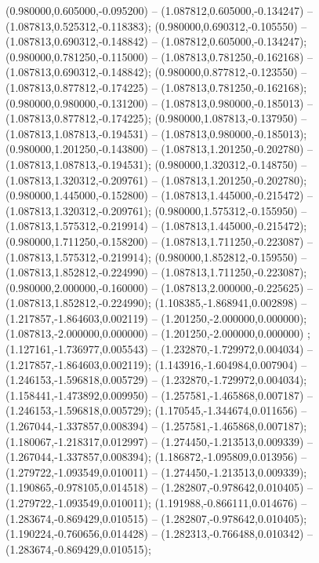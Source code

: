  (0.980000,0.605000,-0.095200) -- (1.087812,0.605000,-0.134247) -- (1.087813,0.525312,-0.118383);
 (0.980000,0.690312,-0.105550) -- (1.087813,0.690312,-0.148842) -- (1.087812,0.605000,-0.134247);
 (0.980000,0.781250,-0.115000) -- (1.087813,0.781250,-0.162168) -- (1.087813,0.690312,-0.148842);
 (0.980000,0.877812,-0.123550) -- (1.087813,0.877812,-0.174225) -- (1.087813,0.781250,-0.162168);
 (0.980000,0.980000,-0.131200) -- (1.087813,0.980000,-0.185013) -- (1.087813,0.877812,-0.174225);
 (0.980000,1.087813,-0.137950) -- (1.087813,1.087813,-0.194531) -- (1.087813,0.980000,-0.185013);
 (0.980000,1.201250,-0.143800) -- (1.087813,1.201250,-0.202780) -- (1.087813,1.087813,-0.194531);
 (0.980000,1.320312,-0.148750) -- (1.087813,1.320312,-0.209761) -- (1.087813,1.201250,-0.202780);
 (0.980000,1.445000,-0.152800) -- (1.087813,1.445000,-0.215472) -- (1.087813,1.320312,-0.209761);
 (0.980000,1.575312,-0.155950) -- (1.087813,1.575312,-0.219914) -- (1.087813,1.445000,-0.215472);
 (0.980000,1.711250,-0.158200) -- (1.087813,1.711250,-0.223087) -- (1.087813,1.575312,-0.219914);
 (0.980000,1.852812,-0.159550) -- (1.087813,1.852812,-0.224990) -- (1.087813,1.711250,-0.223087);
 (0.980000,2.000000,-0.160000) -- (1.087813,2.000000,-0.225625) -- (1.087813,1.852812,-0.224990);
 (1.108385,-1.868941,0.002898) -- (1.217857,-1.864603,0.002119) -- (1.201250,-2.000000,0.000000);
 (1.087813,-2.000000,0.000000) -- (1.201250,-2.000000,0.000000) ;
 (1.127161,-1.736977,0.005543) -- (1.232870,-1.729972,0.004034) -- (1.217857,-1.864603,0.002119);
 (1.143916,-1.604984,0.007904) -- (1.246153,-1.596818,0.005729) -- (1.232870,-1.729972,0.004034);
 (1.158441,-1.473892,0.009950) -- (1.257581,-1.465868,0.007187) -- (1.246153,-1.596818,0.005729);
 (1.170545,-1.344674,0.011656) -- (1.267044,-1.337857,0.008394) -- (1.257581,-1.465868,0.007187);
 (1.180067,-1.218317,0.012997) -- (1.274450,-1.213513,0.009339) -- (1.267044,-1.337857,0.008394);
 (1.186872,-1.095809,0.013956) -- (1.279722,-1.093549,0.010011) -- (1.274450,-1.213513,0.009339);
 (1.190865,-0.978105,0.014518) -- (1.282807,-0.978642,0.010405) -- (1.279722,-1.093549,0.010011);
 (1.191988,-0.866111,0.014676) -- (1.283674,-0.869429,0.010515) -- (1.282807,-0.978642,0.010405);
 (1.190224,-0.760656,0.014428) -- (1.282313,-0.766488,0.010342) -- (1.283674,-0.869429,0.010515);
